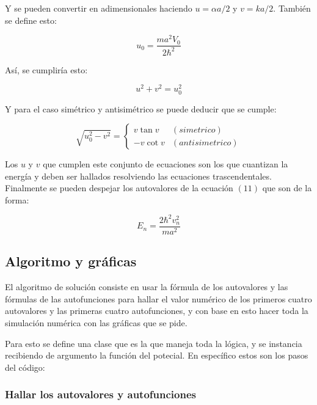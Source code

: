 \documentclass{article}
\begin{document}
Y se pueden convertir en adimensionales haciendo $u=\alpha a/2$ y $v=ka/2$. También se define esto:

\begin{equation}
    u_0=\frac{ma^2V_0}{2\hbar^2}
\end{equation}

Así, se cumpliría esto:

\begin{equation}
    u^2+v^2=u_0^2
\end{equation}

Y para el caso simétrico y antisimétrico se puede deducir que se cumple:

\begin{equation}
    \sqrt{u_0^2-v^2}= 
    \begin{cases}
       v\tan v&(simetrico) \\
       -v\cot v&(antisimetrico)
    \end{cases}
\end{equation}

Los $u$ y $v$ que cumplen este conjunto de ecuaciones son los que cuantizan la energía y deben ser hallados resolviendo las ecuaciones trascendentales. Finalmente se pueden despejar los autovalores de la ecuación $(11)$ que son de la forma:

\begin{equation}
    E_n=\frac{2\hbar^2v_n^2}{ma^2}
\end{equation}

\subsection{Algoritmo y gráficas}

El algoritmo de solución consiste en usar la fórmula de los autovalores y las fórmulas de las autofunciones para hallar el valor numérico de los primeros cuatro autovalores y las primeras cuatro autofunciones, y con base en esto hacer toda la simulación numérica con las gráficas que se pide.

Para esto se define una clase  que es la que maneja toda la lógica, y se instancia recibiendo de argumento la función del potecial. En específico estos son los pasos del código:

\subsubsection{Hallar los autovalores y autofunciones}
\end{document}

